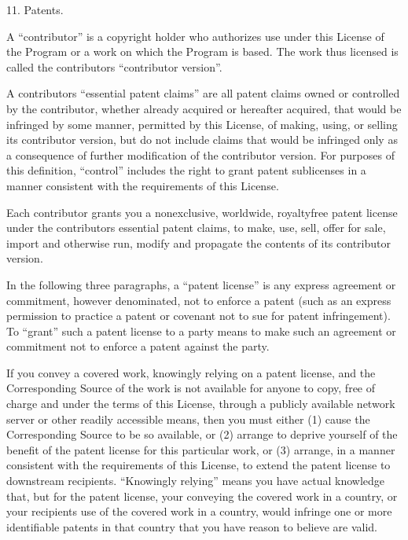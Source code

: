 \documentclass[letterpaper,10pt,english]{sphinxmanual}
\begin{document}
\begin{sphinxVerbatim}[commandchars=\\\{\}]
 11. Patents.

    A “contributor” is a copyright holder who authorizes use under this License
    of the Program or a work on which the Program is based. The work thus
    licensed is called the contributor\PYGZsq{}s “contributor version”.

    A contributor\PYGZsq{}s “essential patent claims” are all patent claims owned or
    controlled by the contributor, whether already acquired or hereafter
    acquired, that would be infringed by some manner, permitted by this
    License, of making, using, or selling its contributor version, but do not
    include claims that would be infringed only as a consequence of further
    modification of the contributor version. For purposes of this definition,
    “control” includes the right to grant patent sublicenses in a manner
    consistent with the requirements of this License.

    Each contributor grants you a non\PYGZhy{}exclusive, worldwide, royalty\PYGZhy{}free patent
    license under the contributor\PYGZsq{}s essential patent claims, to make, use,
    sell, offer for sale, import and otherwise run, modify and propagate the
    contents of its contributor version.

    In the following three paragraphs, a “patent license” is any express
    agreement or commitment, however denominated, not to enforce a patent (such
    as an express permission to practice a patent or covenant not to sue for
    patent infringement). To “grant” such a patent license to a party means to
    make such an agreement or commitment not to enforce a patent against the
    party.

    If you convey a covered work, knowingly relying on a patent license, and
    the Corresponding Source of the work is not available for anyone to copy,
    free of charge and under the terms of this License, through a publicly
    available network server or other readily accessible means, then you must
    either (1) cause the Corresponding Source to be so available, or (2)
    arrange to deprive yourself of the benefit of the patent license for this
    particular work, or (3) arrange, in a manner consistent with the
    requirements of this License, to extend the patent license to downstream
    recipients. “Knowingly relying” means you have actual knowledge that, but
    for the patent license, your conveying the covered work in a country, or
    your recipient\PYGZsq{}s use of the covered work in a country, would infringe one
    or more identifiable patents in that country that you have reason to
    believe are valid.


\end{sphinxVerbatim}
\end{document}
